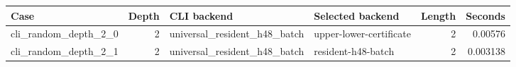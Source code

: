 {\small
\begin{tabular}{lrllrr}
\hline
Case & Depth & CLI backend & Selected backend & Length & Seconds \\
\hline
cli\_random\_depth\_2\_0 & 2 & universal\_resident\_h48\_batch & upper-lower-certificate & 2 & 0.00576 \\
cli\_random\_depth\_2\_1 & 2 & universal\_resident\_h48\_batch & resident-h48-batch & 2 & 0.003138 \\
\hline
\end{tabular}
}
